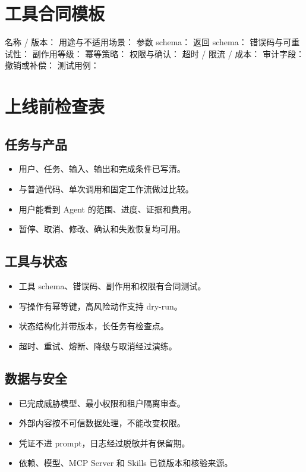 \section{工具合同模板}

\begin{codeblock}
名称 / 版本：
用途与不适用场景：
参数 schema：
返回 schema：
错误码与可重试性：
副作用等级：
幂等策略：
权限与确认：
超时 / 限流 / 成本：
审计字段：
撤销或补偿：
测试用例：
\end{codeblock}

\section{上线前检查表}

\subsection{任务与产品}

\begin{itemize}
  \item \checkbox 用户、任务、输入、输出和完成条件已写清。
  \item \checkbox 与普通代码、单次调用和固定工作流做过比较。
  \item \checkbox 用户能看到 Agent 的范围、进度、证据和费用。
  \item \checkbox 暂停、取消、修改、确认和失败恢复均可用。
\end{itemize}

\subsection{工具与状态}

\begin{itemize}
  \item \checkbox 工具 schema、错误码、副作用和权限有合同测试。
  \item \checkbox 写操作有幂等键，高风险动作支持 dry-run。
  \item \checkbox 状态结构化并带版本，长任务有检查点。
  \item \checkbox 超时、重试、熔断、降级与取消经过演练。
\end{itemize}

\subsection{数据与安全}

\begin{itemize}
  \item \checkbox 已完成威胁模型、最小权限和租户隔离审查。
  \item \checkbox 外部内容按不可信数据处理，不能改变权限。
  \item \checkbox 凭证不进 prompt，日志经过脱敏并有保留期。
  \item \checkbox 依赖、模型、MCP Server 和 Skills 已锁版本和核验来源。
\end{itemize}

